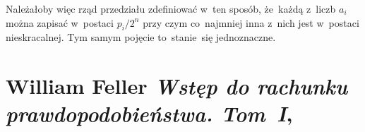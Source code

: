 \documentclass[a4paper,11pt]{article}
\numberwithin{equation}{section}
\begin{document}
Należałoby więc rząd przedziału zdefiniować w~ten sposób, że~każdą
z~liczb $a_{ i }$ można zapisać w~postaci $p_{ i } / 2^{ n }$ przy
czym co~najmniej inna z~nich jest w~postaci nieskracalnej. Tym samym
pojęcie to~stanie~się jednoznaczne.

\VerSpaceFour





















\section{William Feller \textit{Wstęp do rachunku prawdopodobieństwa. Tom~I},
  \cite{FellerWstepDoRachunkuPrawdopodobienstwaVolI2006}}
\end{document}
